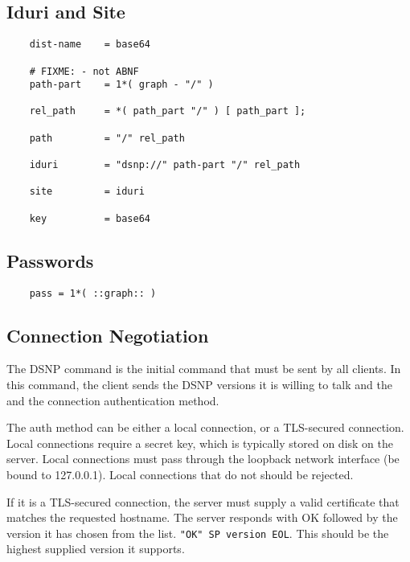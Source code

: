 \documentclass[letterpaper,11pt,oneside]{article}
\begin{document}
\subsection{Iduri and Site}

\vspace{10pt}
\begin{verbatim}
    dist-name    = base64

    # FIXME: - not ABNF
    path-part    = 1*( graph - "/" )

    rel_path     = *( path_part "/" ) [ path_part ];

    path         = "/" rel_path

    iduri        = "dsnp://" path-part "/" rel_path

    site         = iduri

    key          = base64
\end{verbatim}

\subsection{Passwords}

\vspace{10pt}
\begin{verbatim}
    pass = 1*( ::graph:: )
\end{verbatim}
\vspace{10pt}

\subsection{Connection Negotiation}

The DSNP command is the initial command that must be sent by all clients. In
this command, the client sends the DSNP versions it is willing to talk and the
and the connection authentication method.

The auth method can be either a local connection, or a TLS-secured connection.
Local connections require a secret key, which is typically stored on disk on
the server. Local connections must pass through the loopback network interface
(be bound to 127.0.0.1). Local connections that do not should be rejected.

If it is a TLS-secured connection, the server must supply a valid certificate
that matches the requested hostname. The server responds with OK followed by
the version it has chosen from the list. \verb|"OK" SP version EOL|. This
should be the highest supplied version it supports.
\end{document}
